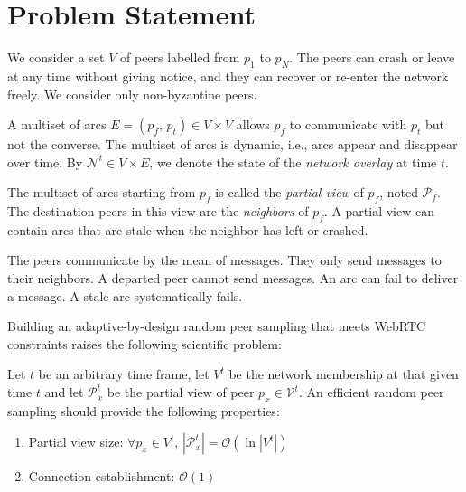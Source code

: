 
\section{Problem Statement}
\label{sec:problem-statement}

We consider a set $V$ of peers labelled from $p_1$ to $p_N$.  The peers can
crash or leave at any time without giving notice, and they can recover or
re-enter the network freely. We consider only non-byzantine peers.

A multiset of arcs $E = (p_f,\,p_t) \in V \times V$ allows $p_f$ to
communicate with $p_t$ but not the converse. The multiset of arcs is
dynamic, i.e., arcs appear and disappear over time. By $\mathcal{N}^t
\in V \times E$, we denote the state of the \emph{network overlay} at
time $t$.

The multiset of arcs starting from $p_f$ is called the \emph{partial view} of
$p_f$, noted $\mathcal{P}_f$. The destination peers in this view are the
\emph{neighbors} of $p_f$. A partial view can contain arcs that are stale when
the neighbor has left or crashed.

The peers communicate by the mean of messages. They only send messages to their
neighbors. A departed peer cannot send messages. An arc can fail to deliver a
message. A stale arc systematically fails.

Building an adaptive-by-design random peer sampling that meets WebRTC
constraints raises the following scientific problem:
\begin{problem}
  Let $t$ be an arbitrary time frame, let $V^t$ be the network membership at
  that given time $t$ and let $\mathcal{P}_x^t$ be the partial view of peer
  $p_x \in \mathcal{V}^t$.  An efficient random peer sampling should provide
  the following properties:
  \begin{enumerate}
  \item Partial view size: \hfill
    $\forall p_x \in V^t,\, |\mathcal{P}_x^t| = \mathcal{O} (\ln
    |V^t|)$      
  \item Connection establishment: \hfill $\mathcal{O}(1)$
  \end{enumerate}
\end{problem}

